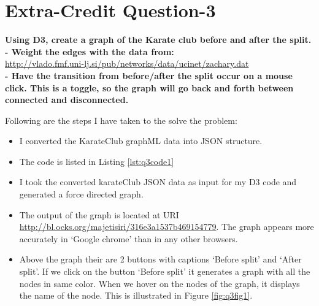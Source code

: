 \chapter{Extra-Credit Question-3}
\label{intro}

\textbf{Using D3, create a graph of the Karate club before and after the split.}\\
\textbf{- Weight the edges with the data from: }\\
\url{http://vlado.fmf.uni-lj.si/pub/networks/data/ucinet/zachary.dat}\\
\textbf{- Have the transition from before/after the split occur on a mouse click.  This is a toggle, so the graph will go back and forth between connected and disconnected.}

Following are the steps I have taken to the solve the problem:
\begin{itemize}
\item  I converted the KarateClub graphML data into JSON structure.
\item The code is listed in Listing \ref{lst:q3code1} 
\item I took the converted karateClub JSON data as input for my D3 code and generated a force directed graph.
\item The output of the graph is located at URI \url {http://bl.ocks.org/majetisiri/316e3a1537b469154779}. The graph appears more accurately in `Google chrome' than in any other browsers.
\newpage
\item Above the graph their are 2 buttons with captions `Before split' and `After split'. If we click on the button `Before split' it generates a graph with all the nodes in same color. When we hover on the nodes of the graph, it displays the name of the node. This is illustrated in Figure \ref{fig:q3fig1}.
\begin{figure}[h!]
\begin{center}

\end{center}
\end{figure}
\end{itemize}
